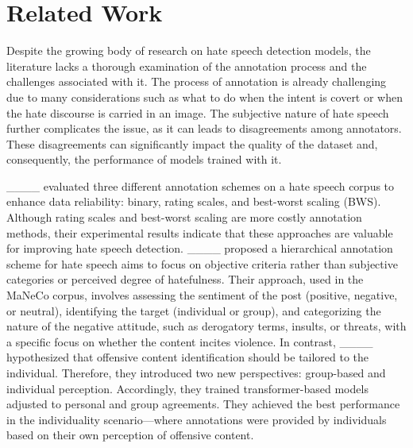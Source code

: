 \section{Related Work}
\label{sec:related-work}
Despite the growing body of research on hate speech detection models, the literature lacks a thorough examination of the annotation process and the challenges associated with it. The process of annotation is already challenging due to many considerations such as what to do when the intent is covert or when the hate discourse is carried in an image. The subjective nature of hate speech further complicates the issue, as it can leads to disagreements among annotators. These disagreements can significantly impact the quality of the dataset and, consequently, the performance of  models trained with it.

____ evaluated three different annotation schemes on a hate speech corpus to enhance data reliability: binary, rating scales, and best-worst scaling (BWS). Although rating scales and best-worst scaling are more costly annotation methods, their experimental results indicate that these approaches are valuable for improving hate speech detection. 
%
____ proposed a hierarchical annotation scheme for hate speech aims to  focus on objective criteria rather than subjective categories or perceived degree of hatefulness. Their approach, used in the MaNeCo corpus, involves assessing the sentiment of the post (positive, negative, or neutral), identifying the target (individual or group), and categorizing the nature of the negative attitude, such as derogatory terms, insults, or threats, with a specific focus on whether the content incites violence. 
In contrast, ____ hypothesized that offensive content identification should be tailored to the individual. Therefore, they introduced two new perspectives: group-based and individual perception. Accordingly, they trained transformer-based models adjusted to personal and group agreements. They achieved the best performance in the individuality scenario—where annotations were provided by individuals based on their own perception of offensive content.

